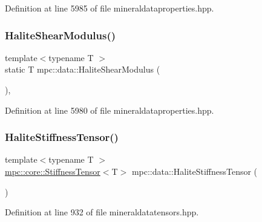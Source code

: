 Definition at line 5985 of file mineraldataproperties.\+hpp.

\mbox{\label{namespacempc_1_1data_af941310481310064722df135c7d8df36}} 
\subsubsection{\texorpdfstring{Halite\+Shear\+Modulus()}{HaliteShearModulus()}}
{\footnotesize\ttfamily template$<$typename T $>$ \\
static T mpc\+::data\+::\+Halite\+Shear\+Modulus (\begin{DoxyParamCaption}{ }\end{DoxyParamCaption})\hspace{0.3cm}{\ttfamily [inline]}, {\ttfamily [static]}}



Definition at line 5980 of file mineraldataproperties.\+hpp.

\mbox{\label{namespacempc_1_1data_a309b60a4ca36aa931d7b573027abf387}} 
\subsubsection{\texorpdfstring{Halite\+Stiffness\+Tensor()}{HaliteStiffnessTensor()}}
{\footnotesize\ttfamily template$<$typename T $>$ \\
\mbox{\hyperlink{structmpc_1_1core_1_1_stiffness_tensor}{mpc\+::core\+::\+Stiffness\+Tensor}}$<$T$>$ mpc\+::data\+::\+Halite\+Stiffness\+Tensor (\begin{DoxyParamCaption}{ }\end{DoxyParamCaption})}



Definition at line 932 of file mineraldatatensors.\+hpp.

\mbox{\label{namespacempc_1_1data_a932cfb05d431249b44ab372a849edcde}} 
